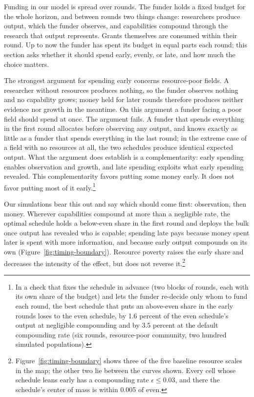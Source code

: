 \documentclass[article, 11pt, reqno]{amsart}
\theoremstyle{named}
\begin{document}
Funding in our model is spread over rounds. The funder holds a fixed budget for the whole horizon, and between rounds two things change: researchers produce output, which the funder observes, and capabilities compound through the research that output represents. Grants themselves are consumed within their round. Up to now the funder has spent its budget in equal parts each round; this section asks whether it should spend early, evenly, or late, and how much the choice matters.

The strongest argument for spending early concerns resource-poor fields. A researcher without resources produces nothing, so the funder observes nothing and no capability grows; money held for later rounds therefore produces neither evidence nor growth in the meantime. On this argument a funder facing a poor field should spend at once. The argument fails. A funder that spends everything in the first round allocates before observing any output, and knows exactly as little as a funder that spends everything in the last round; in the extreme case of a field with no resources at all, the two schedules produce identical expected output. What the argument does establish is a complementarity: early spending enables observation and growth, and late spending exploits what early spending revealed. This complementarity favors putting some money early. It does not favor putting most of it early.\footnote{In a check that fixes the schedule in advance (two blocks of rounds, each with its own share of the budget) and lets the funder re-decide only whom to fund each round, the best schedule that puts an above-even share in the early rounds loses to the even schedule, by 1.6 percent of the even schedule's output at negligible compounding and by 3.5 percent at the default compounding rate (six rounds, resource-poor community, two hundred simulated populations).}

Our simulations bear this out and say which should come first: observation, then money. Wherever capabilities compound at more than a negligible rate, the optimal schedule holds a below-even share in the first round and deploys the bulk once output has revealed who is capable; spending late pays because money spent later is spent with more information, and because early output compounds on its own (Figure~\ref{fig:timing-boundary}). Resource poverty raises the early share and decreases the intensity of the effect, but does not reverse it.\footnote{Figure~\ref{fig:timing-boundary} shows three of the five baseline resource scales in the map; the other two lie between the curves shown. Every cell whose schedule leans early has a compounding rate $\epsilon \leq 0.03$, and there the schedule's center of mass is within 0.005 of even.}
\end{document}
